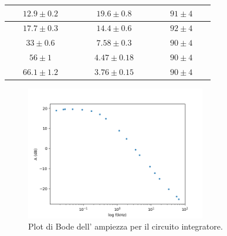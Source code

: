 \documentclass[10pt,a4paper]{article}
\newcommand{\exn}{\phantom{xxx}}
\begin{document}
\begin{table}[h]
\begin{center}
\begin{tabular}{|c|c|c|}
				$\exn 12.9\pm 0.2 \exn $  & $\exn 19.6 \pm 0.8 \exn $ & $\exn 91 \pm  4\exn $ \\
				\hline
				$\exn 17.7\pm 0.3\exn $ & $\exn14.4\pm 0.6 \exn $ & $\exn 92\pm4\exn $ \\

				\hline
				$\exn 33\pm 0.6\exn $& $\exn7.58 \pm  0.3
   \exn $ & $\exn90 \pm 4 \exn $ \\
				\hline
				$\exn 56\pm 1 \exn $  & $\exn 4.47\pm0.18   \exn $ & $\exn 90\pm 4\exn $ \\
				
				
				\hline
				$\exn 66.1\pm 1.2\exn $ & $\exn3.76 \pm  0.15 \exn $ & $\exn90 \pm 4\exn $ \\
			
				
				\hline
				
				
				
				
			\end{tabular}
		\end{center}
	\end{table} 


	\begin{figure}[h]
		\begin{center}
			
			\includegraphics[width=0.7\textwidth]{bodeint}
			
	\end{center}
		\caption{\small Plot di Bode dell' ampiezza  per il circuito integratore.}
		\label{fig:bodeinte}
	\end{figure}
\end{document}
